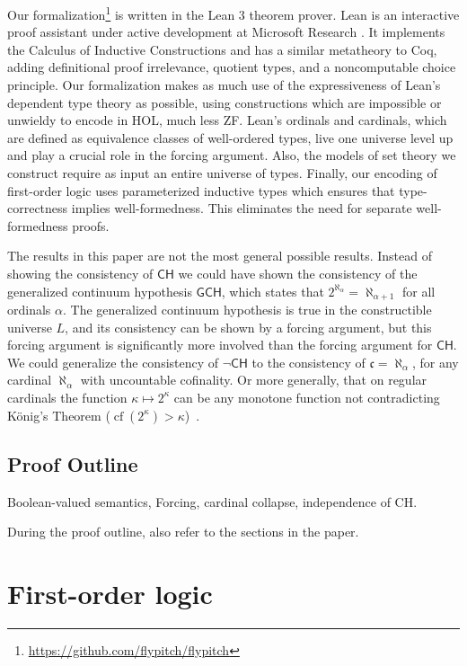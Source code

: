 \documentclass[sigplan,10pt,review, anonymous]{acmart}
\theoremstyle{definition}
\DeclareMathOperator{\cf}{cf}
\begin{document}
Our formalization\footnote{\url{https://github.com/flypitch/flypitch}} is written in the Lean 3 theorem prover.
Lean is an interactive proof assistant under active development at Microsoft Research \cite{de2015lean, sebastian1}.
It implements the Calculus of Inductive Constructions and has a similar metatheory to Coq, adding definitional proof irrelevance, quotient types, and a noncomputable choice principle.
Our formalization makes as much use of the expressiveness of Lean's dependent type theory as possible, using constructions which are impossible or unwieldy to encode in HOL, much less ZF. Lean's ordinals and cardinals, which are defined as equivalence classes of well-ordered types, live one universe level up and play a crucial role in the forcing argument.
Also, the models of set theory we construct require as input an entire universe of types.
Finally, our encoding of first-order logic uses parameterized inductive types which ensures that type-correctness implies well-formedness. This eliminates the need for separate well-formedness proofs.

The results in this paper are not the most general possible results.
Instead of showing the consistency of $\mathsf{CH}$ we could have shown the consistency of the generalized continuum hypothesis $\mathsf{GCH}$, which states that $2^{\aleph_\alpha}=\aleph_{\alpha+1}$ for all ordinals $\alpha$.
The generalized continuum hypothesis is true in the constructible universe $L$, and its consistency can be shown by a forcing argument, but this forcing argument is significantly more involved than the forcing argument for $\mathsf{CH}$.
We could generalize the consistency of $\neg \mathsf{CH}$ to the consistency of $\mathfrak{c}=\aleph_\alpha$, for any cardinal $\aleph_\alpha$ with uncountable cofinality.
Or more generally, that on regular cardinals the function $\kappa\mapsto 2^\kappa$ can be any monotone function not contradicting K\"onig's Theorem ($\cf(2^\kappa)>\kappa$)~\cite{easton1970powers}.

\subsection{Proof Outline}
\label{subsection:intro:outline}
Boolean-valued semantics, Forcing, cardinal collapse, independence of CH.

During the proof outline, also refer to the sections in the paper.
\section{First-order logic}
\label{section:fol}
\end{document}
